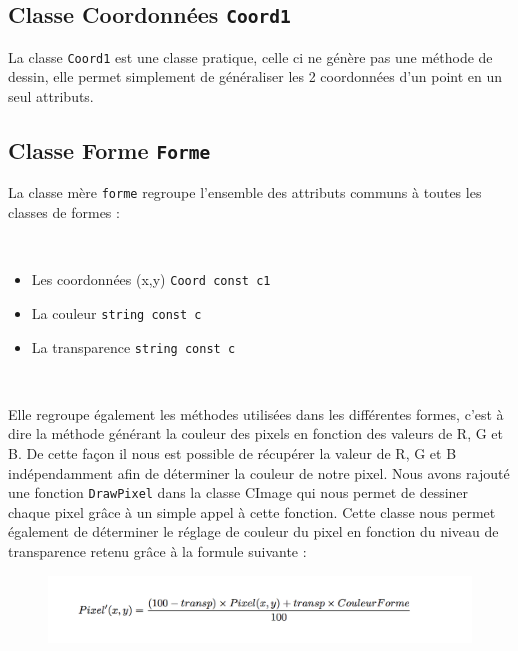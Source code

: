 \documentclass[11pt]{article}
\begin{document}
\subsection{Classe Coordonnées \texttt{Coord1}}

La classe \texttt{Coord1} est une classe pratique, celle ci ne génère pas une méthode de dessin, elle permet simplement de généraliser les 2 coordonnées d'un point en un seul attributs.

\clearpage

\subsection{Classe Forme \texttt{Forme}}

La classe mère \texttt{forme} regroupe l'ensemble des attributs communs à toutes les classes de formes :

\
\

\begin{itemize}
    \item Les coordonnées (x,y) \texttt{Coord const c1}
    \item La couleur \texttt{string const c}
    \item La transparence \texttt{string const c}
\end{itemize} 

\
\

Elle regroupe également les méthodes utilisées dans les différentes formes, c'est à dire la méthode générant la couleur des pixels en fonction des valeurs de R, G et B. De cette façon il nous est possible de récupérer la valeur de R, G et B indépendamment afin de déterminer la couleur de notre pixel. Nous avons rajouté une fonction \texttt{DrawPixel} dans la classe CImage qui nous permet de dessiner chaque pixel grâce à un simple appel à cette fonction. Cette classe nous permet également de déterminer le réglage de couleur du pixel en fonction du niveau de transparence retenu grâce à la formule suivante : 

\begin{figure}[!htbp]
    \begin{center}
        \includegraphics[width=12cm]{Formule.png}
    \centering
    \end{center}
\end{figure}
\end{document}
